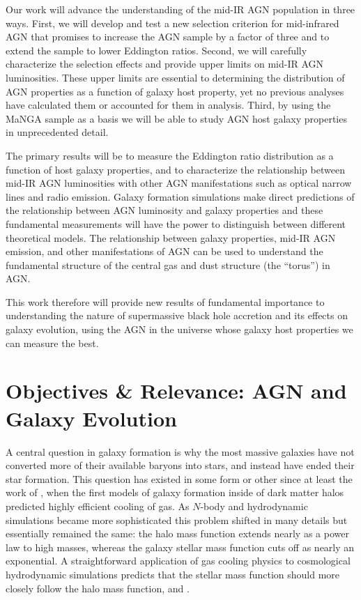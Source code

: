 \documentclass[12pt, preprint]{hacked-aastex}
\begin{document}
Our work will advance the understanding of the mid-IR AGN population
in three ways. First, we will develop and test a new selection
criterion for mid-infrared AGN that promises to increase the AGN
sample by a factor of three and to extend the sample to lower
Eddington ratios. Second, we will carefully characterize the selection
effects and provide upper limits on mid-IR AGN luminosities. These
upper limits are essential to determining the distribution of AGN
properties as a function of galaxy host property, yet no previous
analyses have calculated them or accounted for them in analysis.
Third, by using the MaNGA sample as a basis we will be able to study
AGN host galaxy properties in unprecedented detail.

The primary results will be to measure the Eddington ratio
distribution as a function of host galaxy properties, and to
characterize the relationship between mid-IR AGN luminosities with
other AGN manifestations such as optical narrow lines and radio
emission. Galaxy formation simulations make direct predictions of the
relationship between AGN luminosity and galaxy properties and these
fundamental measurements will have the power to distinguish between
different theoretical models. The relationship between galaxy
properties, mid-IR AGN emission, and other manifestations of AGN can
be used to understand the fundamental structure of the central gas and
dust structure (the ``torus'') in AGN.

This work therefore will provide new results of fundamental importance
to understanding the nature of supermassive black hole accretion and
its effects on galaxy evolution, using the AGN in the universe whose
galaxy host properties we can measure the best.

\section{Objectives \& Relevance: AGN and Galaxy Evolution}\label{sec:intro}


A central question in galaxy formation is why the most massive
galaxies have not converted more of their available baryons into
stars, and instead have ended their star formation. This question has
existed in some form or other since at least the work of
\cite{white78a}, when the first models of galaxy formation inside of
dark matter halos predicted highly efficient cooling of gas. As
$N$-body and hydrodynamic simulations became more sophisticated this
problem shifted in many details but essentially remained the same: the
halo mass function extends nearly as a power law to high masses,
whereas the galaxy stellar mass function cuts off as nearly an
exponential.  A straightforward application of gas cooling physics to
cosmological hydrodynamic simulations predicts that the stellar mass
function should more closely follow the halo mass function, and 
\cite{benson03a, somerville15a}.
\end{document}
